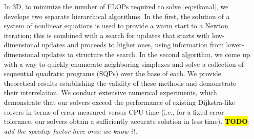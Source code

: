 \documentclass[eikonal.tex]{subfiles}
\begin{document}
In 3D, to minimize the number of FLOPs required to solve
\cref{eq:eikonal}, we develope two separate hierarchical
algorithms. In the first, the solution of a system of nonlinear
equations is used to provide a warm start to a Newton iteration; this
is combined with a search for updates that starts with low-dimensional
updates and proceeds to higher ones, using information from
lower-dimensional updates to structure the search. In the second
algorithm, we come up with a way to quickly enumerate neighboring
simplexes and solve a collection of sequential quadratic programs
(SQPs) over the base of each. We provide theoretical results
establishing the validity of these methods and demonstrate their
interrelation. We conduct extensive numerical experiments, which
demonstrate that our solvers exceed the performance of existing
Dijkstra-like solvers in terms of error measured versus CPU time
(i.e., for a fixed error tolerance, our solvers obtain a sufficiently
accurate solution in less time). \hl{\textbf{TODO}}: \emph{add the
  speedup factor here once we know it.}
\end{document}
